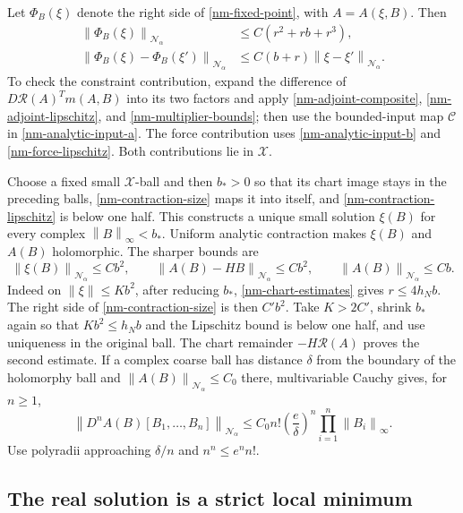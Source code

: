 \documentclass[11pt]{article}
\theoremstyle{remark}
\newcommand{\norm}[1]{\left\|#1\right\|}
\begin{document}
Let $\Phi_B(\xi)$ denote the right side of
\eqref{nm-fixed-point}, with $A=A(\xi,B)$. Then
\begin{align}
 \norm{\Phi_B(\xi)}_{\mathcal N_\alpha}
 &\le C(r^2+rb+r^3),                                   \label{nm-contraction-size}\\
 \norm{\Phi_B(\xi)-\Phi_B(\xi')}_{\mathcal N_\alpha}
 &\le C(b+r)\norm{\xi-\xi'}_{\mathcal N_\alpha}.          \label{nm-contraction-lipschitz}
\end{align}
To check the constraint contribution, expand the difference of
$D\mathcal R(A)^Tm(A,B)$ into its two factors and apply
\eqref{nm-adjoint-composite}, \eqref{nm-adjoint-lipschitz}, and
\eqref{nm-multiplier-bounds}; then use the bounded-input map
$\mathcal C$ in \eqref{nm-analytic-input-a}. The force contribution
uses \eqref{nm-analytic-input-b} and
\eqref{nm-force-lipschitz}. Both contributions lie in $\mathcal X$.

Choose a fixed small $\mathcal X$-ball and then $b_*>0$ so that its
chart image stays in the preceding balls, \eqref{nm-contraction-size}
maps it into itself, and \eqref{nm-contraction-lipschitz} is below
one half. This constructs a unique small solution $\xi(B)$ for
every complex $\norm{B}_\infty<b_*$. Uniform analytic contraction
makes $\xi(B)$ and $A(B)$ holomorphic. The sharper bounds are
\begin{equation}\label{nm-quadratic-remainder}
 \norm{\xi(B)}_{\mathcal N_\alpha}\le Cb^2,
 \qquad \norm{A(B)-HB}_{\mathcal N_\alpha}\le Cb^2,
 \qquad \norm{A(B)}_{\mathcal N_\alpha}\le Cb.
\end{equation}
Indeed on $\norm{\xi}\le Kb^2$, after reducing $b_*$,
\eqref{nm-chart-estimates} gives $r\le4h_Nb$. The right side of
\eqref{nm-contraction-size} is then $C'b^2$. Take $K>2C'$, shrink
$b_*$ again so that $Kb^2\le h_Nb$ and the Lipschitz bound is below
one half, and use uniqueness in the original ball. The chart
remainder $-H\mathcal R(A)$ proves the second estimate.
If a complex coarse ball has distance $\delta$ from the boundary
of the holomorphy ball and $\norm{A(B)}_{\mathcal N_\alpha}\le C_0$
there, multivariable Cauchy gives, for $n\ge1$,
\begin{equation}\label{nm-cauchy}
 \norm{D^nA(B)[B_1,\ldots,B_n]}_{\mathcal N_\alpha}
 \le C_0 n!\left(\frac e\delta\right)^n
                    \prod_{i=1}^n\norm{B_i}_\infty.
\end{equation}
Use polyradii approaching $\delta/n$ and $n^n\le e^n n!$.

\subsection{The real solution is a strict local minimum}
\label{nm-minimum}
\end{document}

